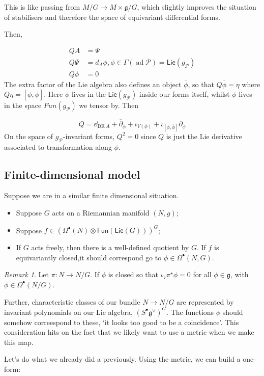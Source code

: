\documentclass[leqno, openany]{memoir}
\theoremstyle{definition}
\theoremstyle{remark}
\newtheorem{rmk}[thm]{Remark}
\theoremstyle{plain}
\theoremstyle{definition}
\theoremstyle{remark}
\newcommand{\mr}[1]{\mathrm{#1}}
\newcommand{\ms}[1]{\mathsf{#1}}
\DeclareMathOperator{\ad}{ad}
\begin{document}
This is like passing from $M/G \to M \times \mathfrak{g}/G$, which slightly improves the situation of stabilisers and therefore the space of equivariant differential forms.

Then,

\begin{align}
    QA &= \Psi
  \\
    Q\Psi &= d_{A} \phi, \phi \in \Gamma(\ad\mathcal{P}) = \ms{Lie}(g_{\mathcal{P}})
  \\
    Q\phi &= 0
\end{align}
The extra factor of the Lie algebra also defines an object $\overline{\phi}$, so that $Q \overline{\phi} = \eta$ where $Q \eta = [\phi, \overline{\phi}]$.  Here $\overline{\phi}$ lives in the $\ms{Lie}(g_{\mathcal{P}})$ inside our forms itself, whilst $\phi$ lives in the space $Fun(g_{\mathcal{P}})$ we tensor by.  Then

\[
Q = \dd_{\mr{DR}\ A} + \overline{\partial}_{\overline{\phi}} + \iota_{V(\phi)} + \iota_{[\phi,\overline{\phi}]} \partial_{\overline{\phi}}
\]
On the space of $g_{\mathcal{P}}$-invariant forms, $Q^{2} = 0$ since $Q$ is just the Lie derivative associated to transformation along $\phi$.

\subsection{Finite-dimensional model}

Suppose we are in a similar finite dimensional situation.

\begin{itemize}
  \item Suppose $G$ acts on a Riemannian manifold $(N,g)$;
  \item Suppose $f \in (\Omega^{\bullet} (N) \otimes \ms{Fun}(\ms{Lie}(G)))^{G}$;
        \item If $G$ acts freely, then there is a well-defined quotient by $G$. If $f$ is equivariantly closed,it  should correspond go to $\phi \in \Omega^{\bullet}(N,G)$.
\end{itemize}

\begin{rmk}
  Let $\pi : N \to N/G$. If $\phi$ is closed so that $\iota_{V} \pi^{\star}\phi = 0$ for all $\phi \in \mathfrak{g}$, with $\phi \in \Omega^{\bullet}(N/G)$.

    Further, characteristic classes of our bundle $N \to N/G$ are represented by invariant polynomials on our Lie algebra, $(S^{\bullet} \mathfrak{g}^{\vee})^{G}$. The functions $\phi$ should somehow correespond to these, `it looks too good to be a coincidence'. This consideration hits on the fact that we likely want to use a metric when we make this map.
\end{rmk}
Let's do what we already did a previously. Using the metric, we can build a one-form:
\end{document}

